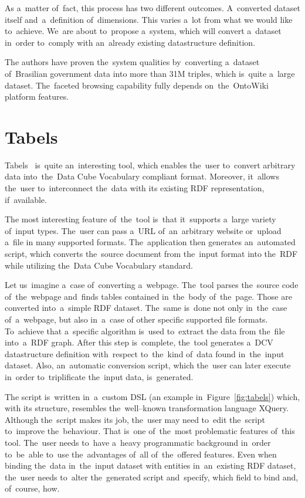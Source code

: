 As a~matter of~fact, this process has two different outcomes. A~converted 
dataset itself and~a~definition of~dimensions. This varies a~lot from what 
we would like to~achieve. We~are about to~propose a~system, which will convert a~dataset in~order to~comply with an~already existing datastructure definition.

The authors have proven the~system qualities by~converting a~dataset of~Brasilian government data
into more than 31M triples, which is~quite a~large dataset. The~faceted browsing
capability fully depends on~the~OntoWiki platform features.

\section{Tabels}
\label{rw:tabels}
Tabels~\cite{tabels-web} is~quite an~interesting tool, which enables the~user to~convert arbitrary data into~the~Data Cube Vocabulary compliant format. 
Moreover, it~allows the~user to~interconnect the~data with its existing RDF 
representation, if~available.

The most interesting feature of~the~tool is~that it~supports a~large variety of~input types. The~user can pass a~URL of~an~arbitrary website or~upload a~file 
in many supported formats. The~application then generates an~automated script, which converts the~source document from the~input format 
into the~RDF while utilizing the~Data Cube Vocabulary standard.

Let us~imagine a~case of~converting a~webpage. The~tool parses the~source code of~the~webpage and~finds tables contained in~the~body of~the~page. Those are converted into~a~simple
RDF dataset. The~same is~done not only in~the~case of~a~webpage, but also in~a~case
of other specific supported file formats. To~achieve that a~specific algorithm is~used to~extract
the data from the~file into~a~RDF graph. After this step is~complete, the~tool generates a~DCV
datastructure definition with~respect to~the~kind of~data found in~the~input dataset.
Also, an~automatic conversion script, which the~user can later execute in~order to~triplificate
the~input data, is~generated.

The script is~written in~a~custom DSL (an example in~Figure~\ref{fig:tabels}) which,
with its structure, resembles the~well--known
transformation language XQuery. Although the~script makes its job, the~user may need to~edit the~script to~improve the~behaviour. That is~one of~the~most problematic features of~this tool. The~user needs to~have a~heavy programmatic 
background in~order to~be~able to~use the~advantages of~all of~the~offered features. 
Even when binding the~data in~the~input dataset with entities in~an~existing RDF 
dataset, the~user needs to~alter the~generated script and~specify, which field 
to bind and, of~course, how.

